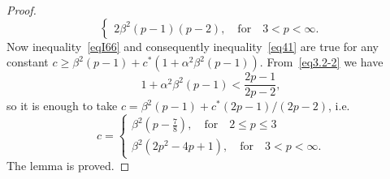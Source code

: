 \documentclass{amsart}
\theoremstyle{definition}
\theoremstyle{remark}
\numberwithin{equation}{section}
\begin{document}
\begin{proof}
\begin{equation*}
\begin{cases}
         2\beta^2(p-1)(p-2), \quad\mbox{for}\quad 3<p< \infty.
        \end{cases}
 \end{equation*}
  Now inequality~\eqref{eqI66} and consequently inequality~\eqref{eq41} are true for any constant 
 $  c\geq\beta^2(p-1)+c^*\left(1+\alpha^2\beta^2(p-1) \right)$. From~\eqref{eq3.2-2} we have 
 \[
 1+\alpha^2\beta^2(p-1)<\frac{2p-1}{2p-2},
 \] 
so it is enough to take $ c=\beta^2(p-1)+c^*(2p-1)/(2p-2)$, i.e. 
 	\begin{equation*}
  c= 
    \begin{cases}
          \beta^2\left(p-\frac{7}{8}\right), \quad\mbox{for}\quad 2\le p\le3\\
         \beta^2 \left(2p^2-4p+1\right), \quad\mbox{for}\quad 3<p< \infty.
        \end{cases}
 \end{equation*}
 The lemma is proved.

\end{proof}
\end{document}
